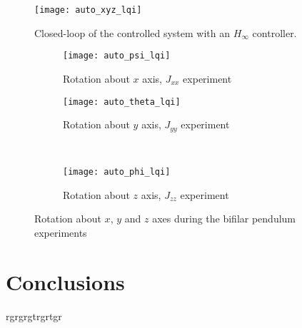 \begin{figure}[h]
	\begin{center}
	\texttt{[image: auto\_xyz\_lqi]}
	\caption{Closed-loop of the controlled system with an $H_{\infty}$ controller.}
	\label{fig:auto_xyz_lqi}
	\end{center}
	\end{figure}
	
\begin{figure}[H]
\begin{subfigure}{.5\linewidth}
\centering
\texttt{[image: auto\_psi\_lqi]}
\caption{Rotation about $x$ axis, $J_{xx}$ experiment}
\label{fig:auto_psi_lqi}
\end{subfigure}%
\begin{subfigure}{.5\linewidth}
\centering
\texttt{[image: auto\_theta\_lqi]}
\caption{Rotation about $y$ axis, $J_{yy}$ experiment}
\label{fig:auto_theta_lqi}
\end{subfigure}\\[1ex]
\begin{subfigure}{\linewidth}
\centering
\texttt{[image: auto\_phi\_lqi]}
\caption{Rotation about $z$ axis, $J_{zz}$ experiment}
\label{fig:auto_psi_lqi}
\end{subfigure}
\caption{Rotation about $x$, $y$ and $z$ axes during the bifilar pendulum experiments}
\label{fig:auto_lqi}
\end{figure}

\section{Conclusions}
rgrgrgtrgrtgr